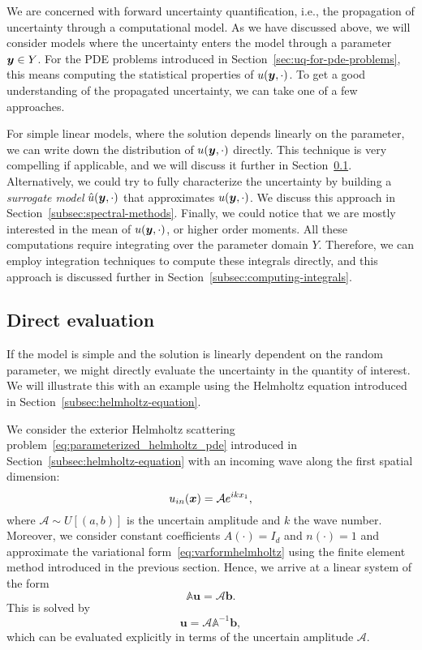 We are concerned with forward uncertainty quantification, i.e., the propagation of uncertainty through a computational model.
As we have discussed above, we will consider models where the uncertainty enters the model through a parameter ${\bm{y}}\in Y$.
For the PDE problems introduced in Section~\ref{sec:uq-for-pde-problems}, this means computing the statistical properties of $u({\bm{y}}, \cdot)$.
To get a good understanding of the propagated uncertainty, we can take one of a few approaches.

For simple linear models, where the solution depends linearly on the parameter, we can write down the distribution of $u({\bm{y}}, \cdot)$ directly.
This technique is very compelling if applicable, and we will discuss it further in Section~\ref{subsec:direct-evaluation}.
Alternatively, we could try to fully characterize the uncertainty by building a \emph{surrogate model} $\hat{u}({\bm{y}}, \cdot)$ that approximates $u({\bm{y}}, \cdot)$.
We discuss this approach in Section~\ref{subsec:spectral-methods}.
Finally, we could notice that we are mostly interested in the mean of $u({\bm{y}},\cdot)$, or higher order moments.
All these computations require integrating over the parameter domain $Y$.
Therefore, we can employ integration techniques to compute these integrals directly, and this approach is discussed further in Section~\ref{subsec:computing-integrals}.

\subsection{Direct evaluation}\label{subsec:direct-evaluation}
If the model is simple and the solution is linearly dependent on the random parameter, we might directly evaluate the uncertainty in the quantity of interest.
We will illustrate this with an example using the Helmholtz equation introduced in Section~\ref{subsec:helmholtz-equation}.
\begin{example}\label{ex:helmholtzdirectex}
We consider the exterior Helmholtz scattering problem~\eqref{eq:parameterized_helmholtz_pde} introduced in Section~\ref{subsec:helmholtz-equation} with an incoming wave along the first spatial dimension:
\begin{equation}
    u_{in}({{\bm{x}}})=\mathcal{A}e^{ik x_{1}},\label{eq:uinexdef}
\end{equation}
where $\mathcal{A}\sim U\left[ (a, b) \right]$ is the uncertain amplitude and $k$ the wave number.
Moreover, we consider constant coefficients $A(\cdot)=I_d$ and $n(\cdot)=1$ and approximate the variational form~\eqref{eq:varformhelmholtz} using the finite element method introduced in the previous section.
Hence, we arrive at a linear system of the form
\begin{equation}
    \mathbb{A}\bm{u}=\mathcal{A}\bm{b}.\label{eq:helmholtzdirectex}
\end{equation}
This is solved by
\begin{equation*}
    \bm{u}=\mathcal{A}\mathbb{A}^{-1}\bm{b},
\end{equation*}
which can be evaluated explicitly in terms of the uncertain amplitude $\mathcal{A}$.
\end{example}

